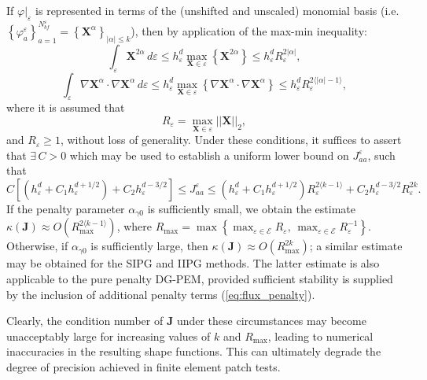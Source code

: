 If $\varphi|_{\varepsilon}$ is represented in terms of the (unshifted and unscaled) monomial basis (i.e. $\left\{ \varphi_a^\varepsilon \right\}_{a=1}^{N^\varepsilon_{bf}} = \left\{ \mathbf{X}^\alpha \right\}_{|\alpha| \leq k}$), then by application of the max-min inequality:
\begin{equation}
	\int_{\varepsilon} \mathbf{X}^{2\alpha} \, d \varepsilon \leq h_{\varepsilon}^d \max_{\mathbf{X} \in \varepsilon} \left\{ \mathbf{X}^{2\alpha} \right\} \leq h_{\varepsilon}^d R_{\varepsilon}^{2|\alpha|},
\end{equation}
\begin{equation}
	\int_{\varepsilon} \nabla \mathbf{X}^{\alpha} \cdot \nabla \mathbf{X}^{\alpha} \, d \varepsilon \leq h_{\varepsilon}^d \max_{\mathbf{X} \in \varepsilon} \left\{ \nabla \mathbf{X}^{\alpha} \cdot \nabla \mathbf{X}^{\alpha} \right\} \leq h_{\varepsilon}^d R_{\varepsilon}^{2\langle|\alpha|-1\rangle},
\end{equation}
where it is assumed that
\begin{equation}
	R_\varepsilon = \max_{\mathbf{X} \in \varepsilon} || \mathbf{X} ||_2,
\end{equation}
and $R_\varepsilon \geq 1$, without loss of generality. Under these conditions, it suffices to assert that $\exists \, C > 0$ which may be used to establish a uniform lower bound on $J^{\varepsilon}_{aa}$, such that
\begin{equation}
	C \left[ (h_\varepsilon^{d} + C_1 h_\varepsilon^{d+1/2}) + C_2 h_\varepsilon^{d-3/2} \right] \leq J^{\varepsilon}_{aa} \leq (h_\varepsilon^{d} + C_1 h_\varepsilon^{d+1/2}) R_{\varepsilon}^{2\langle k-1 \rangle} + C_2 h_\varepsilon^{d-3/2} R_{\varepsilon}^{2k}.
\end{equation}
If the penalty parameter $\alpha_{\gamma0}$ is sufficiently small, we obtain the estimate $\kappa (\mathbf{J}) \approx O(R_{\max}^{2\langle k-1 \rangle})$, where $R_{\max} = \max \left\{ \max_{\varepsilon \in \mathcal{E}} R_\varepsilon, \, \max_{\varepsilon \in \mathcal{E}} R_\varepsilon^{-1} \right\}$. Otherwise, if $\alpha_{\gamma0}$ is sufficiently large, then $\kappa (\mathbf{J}) \approx O(R_{\max}^{2k})$; a similar estimate may be obtained for the SIPG and IIPG methods. The latter estimate is also applicable to the pure penalty DG-PEM, provided sufficient stability is supplied by the inclusion of additional penalty terms (\ref{eq:flux_penalty}).

Clearly, the condition number of $\mathbf{J}$ under these circumstances may become unacceptably large for increasing values of $k$ and $R_{\max}$, leading to numerical inaccuracies in the resulting shape functions. This can ultimately degrade the degree of precision achieved in finite element patch tests.

